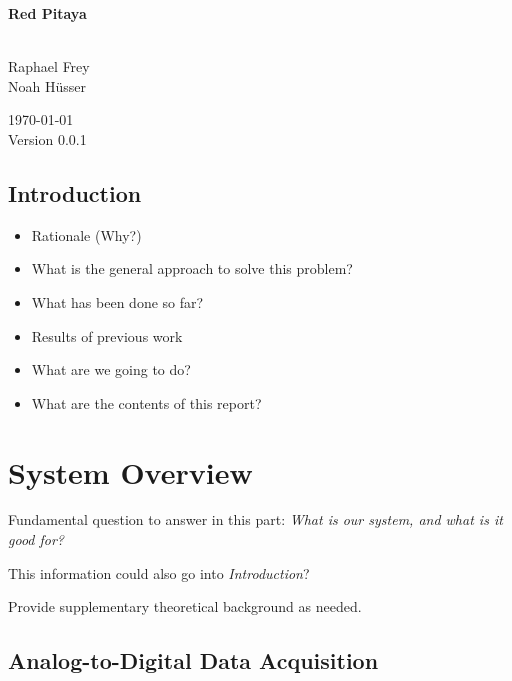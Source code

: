 \documentclass[a4paper,oneside]{alpenthesis/alpenthesis}
\begin{document}
\begin{titlingpage}
    \flushright\sffamily

    \vspace*{5em}
    \Huge\bfseries{Red Pitaya}\\[1ex]
    \Large{}\\[3ex]

    \normalsize\mdseries
    
    \vfill
    Raphael Frey\\
    Noah H\"usser\\[3ex]

    \vspace{5em}

    \today\\
    Version 0.0.1
\end{titlingpage}

\frontmatter
\tableofcontents*

\mainmatter
\chapter{Introduction}
\begin{itemize}\firmlist
    \item Rationale (Why?)
    \item What is the general approach to solve this problem?
    \item What has been done so far?
    \item Results of previous work
    \item What are we going to do?
    \item What are the contents of this report?
\end{itemize}

\part{System Overview}

Fundamental question  to answer in  this part:  \emph{What is our  system, and
what is it good for?}

This information could also go into \emph{Introduction}?

Provide supplementary theoretical background as needed.

\chapter{Analog-to-Digital Data Acquisition}
\end{document}
